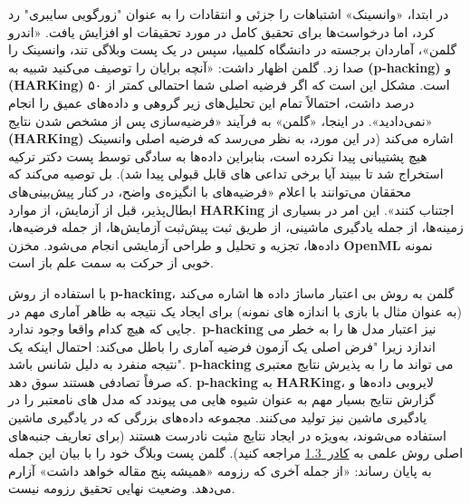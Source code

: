 در ابتدا، «وانسینک» اشتباهات را جزئی و انتقادات را به عنوان "زورگویی سایبری" رد کرد، اما درخواست‌ها برای تحقیق کامل در مورد تحقیقات او افزایش یافت.
«اندرو گلمن»، آماردان برجسته در دانشگاه کلمبیا، سپس در یک پست وبلاگی تند، وانسینک را صدا زد.
گلمن اظهار داشت: «آنچه برایان را توصیف می‌کنید شبیه به \textenglish{\textbf{(p-hacking)}} و \textenglish{\textbf{(HARKing)}} است.
مشکل این است که اگر فرضیه اصلی شما احتمالی کمتر از ۵۰ درصد داشت، احتمالاً تمام این تحلیل‌های زیر گروهی و داده‌های عمیق را انجام نمی‌دادید».
در اینجا، «گلمن» به فرآیند «فرضیه‌سازی پس از مشخص شدن نتایج» \textenglish{\textbf{(HARKing)}} اشاره می‌کند (در این مورد، به نظر می‌رسد که فرضیه اصلی وانسینک هیچ پشتیبانی پیدا نکرده است، بنابراین داده‌ها به سادگی توسط پست دکتر ترکیه استخراج شد تا ببیند آیا برخی تداعی های قابل قبولی پیدا شد).
بل توصیه می‌کند که محققان می‌توانند با اعلام «فرضیه‌های با انگیزه‌ی واضح، در کنار پیش‌بینی‌های ابطال‌پذیر، قبل از آزمایش، از موارد \textenglish{\textbf{HARKing}} اجتناب کنند».
این امر در بسیاری از زمینه‌ها، از جمله یادگیری ماشینی، از طریق ثبت پیش‌ثبت آزمایش‌ها، از جمله فرضیه‌ها، داده‌ها، تجزیه و تحلیل و طراحی آزمایشی انجام می‌شود.
مخزن \textenglish{\textbf{OpenML}} نمونه خوبی از حرکت به سمت علم باز است.

با استفاده از روش \textenglish{\textbf{p-hacking}}، گلمن به روش بی اعتبار ماساژ داده ها اشاره می‌کند (به عنوان مثال با بازی با اندازه های نمونه) برای ایجاد یک نتیجه به ظاهر آماری مهم در جایی که هیچ کدام واقعا وجود ندارد.\ \textenglish{\textbf{p-hacking}} نیز اعتبار مدل ها را به خطر می اندازد زیرا "فرض اصلی یک آزمون فرضیه آماری را باطل می‌کند: احتمال اینکه یک نتیجه منفرد به دلیل شانس باشد".
\mbox{\textenglish{\textbf{p-hacking}}} می تواند ما را به پذیرش نتایج معتبری که صرفاً تصادفی هستند سوق دهد.
\textenglish{\textbf{p-hacking}} به \textenglish{\textbf{HARKing}}، لایروبی داده‌ها و گزارش نتایج بسیار مهم به عنوان شیوه هایی می پیوندد که مدل های نامعتبر را در یادگیری ماشین نیز تولید می‌کنند.
مجموعه داده‌های بزرگی که در یادگیری ماشین استفاده می‌شوند، به‌ویژه در ایجاد نتایج مثبت نادرست هستند (برای تعاریف جنبه‌های اصلی روش علمی به \hyperref[sec:جعبه 1.3]{\mbox{کادر 1.3}} مراجعه کنید).
گلمن پست وبلاگ خود را با بیان این جمله به پایان رساند: «از جمله آخری که رزومه «همیشه پنج مقاله خواهد داشت» آزارم می‌دهد.
وضعیت نهایی تحقیق رزومه نیست.


